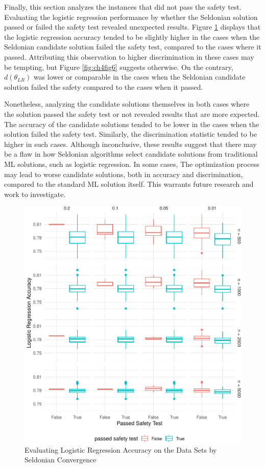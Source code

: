 \documentclass[12pt, twoside]{amherstthesis}
\begin{document}
Finally, this section analyzes the instances that did not pass the safety test. Evaluating the logistic regression performance by whether the Seldonian solution passed or failed the safety test revealed unexpected results. Figure \ref{fig:ch4fig5} displays that the logistic regression accuracy tended to be slightly higher in the cases when the Seldonian candidate solution failed the safety test, compared to the cases where it passed. Attributing this observation to higher discrimination in these cases may be tempting, but Figure \ref{fig:ch4fig6} suggests otherwise. On the contrary, \(d(\theta_{LR})\) was lower or comparable in the cases when the Seldonian candidate solution failed the safety compared to the cases when it passed.

Nonetheless, analyzing the candidate solutions themselves in both cases where the solution passed the safety test or not revealed results that are more expected. The accuracy of the candidate solutions tended to be lower in the cases when the solution failed the safety test. Similarly, the discrimination statistic tended to be higher in such cases. Although inconclusive, these results suggest that there may be a flaw in how Seldonian algorithms select candidate solutions from traditional ML solutions, such as logistic regression. In some cases, The optimization process may lead to worse candidate solutions, both in accuracy and discrimination, compared to the standard ML solution itself. This warrants future research and work to investigate.
\begin{figure}

{\centering \includegraphics{Dasha-Asienga_StatThesis_files/figure-latex/ch4fig5-1} 

}

\caption{Evaluating Logistic Regression Accuracy on the Data Sets by Seldonian Convergence}\label{fig:ch4fig5}
\end{figure}
\end{document}

